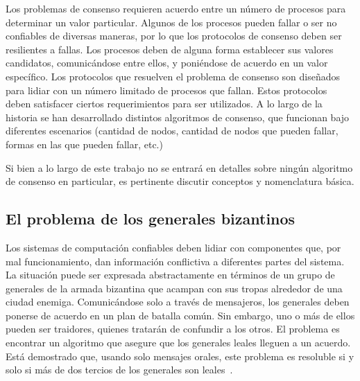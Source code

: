Los problemas de consenso requieren acuerdo entre un número de procesos para determinar un valor particular.
%
Algunos de los procesos pueden fallar o ser no confiables de diversas maneras, por lo que los protocolos de
consenso deben ser resilientes a fallas.
%
Los procesos deben de alguna forma establecer sus valores candidatos, comunicándose entre ellos, y
poniéndose de acuerdo en un valor específico.
%
Los protocolos que resuelven el problema de consenso son diseñados para lidiar con un número limitado de procesos
que fallan.
%
Estos protocolos deben satisfacer ciertos requerimientos para ser utilizados.
%
A lo largo de la historia se han desarrollado distintos algoritmos de consenso, que funcionan bajo diferentes
escenarios (cantidad de nodos, cantidad de nodos que pueden fallar, formas en las que pueden fallar, etc.)

%

Si bien a lo largo de este trabajo no se entrará en detalles sobre ningún algoritmo de consenso en particular,
es pertinente discutir conceptos y nomenclatura básica.

\subsection{El problema de los generales bizantinos}

Los sistemas de computación confiables deben lidiar con componentes que, por mal funcionamiento,
dan información conflictiva a diferentes partes del sistema.
La situación puede ser expresada abstractamente
en términos de un grupo de generales de la armada bizantina que acampan con sus tropas alrededor de una
ciudad enemiga.
Comunicándose solo a través de mensajeros, los generales deben ponerse de acuerdo en un plan
de batalla común.
Sin embargo, uno o más de ellos pueden ser traidores, quienes tratarán de confundir a los
otros.
El problema es encontrar un algoritmo que asegure que los generales leales lleguen a un acuerdo.
Está demostrado que, usando solo mensajes orales, este problema es resoluble si y solo si más de dos tercios
de los generales son leales~\cite{byzantineproblem}.

%


